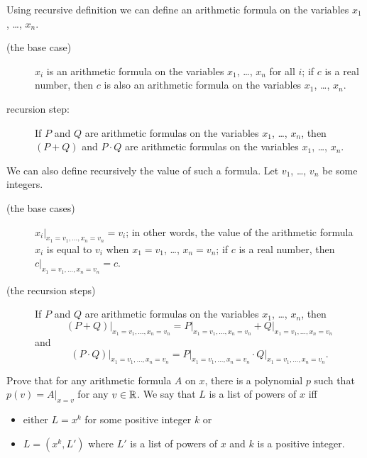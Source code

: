 \begin{chapterendexercises}
    \exercise[recommended]
        Using recursive definition we can define an arithmetic formula on the
        variables $x_1$, \dots, $x_n$.
        \begin{description}
            \item [(the base case)] $x_i$ is an arithmetic formula on the variables $x_1$,
                \dots, $x_n$ for all $i$; if $c$ is a real number, then $c$ is also
                an arithmetic formula on the variables $x_1$, \dots, $x_n$.
            \item[recursion step:] If $P$ and $Q$ are arithmetic formulas on the variables
                $x_1$, \dots, $x_n$, then $(P + Q)$ and $P \cdot Q$ are arithmetic formulas
                on the variables $x_1$, \dots, $x_n$.
        \end{description}

        We can also define recursively the value of such a formula.
        Let $v_1$, \dots, $v_n$ be some integers.
        \begin{description}
            \item[(the base cases)] $x_i\big\rvert_{x_1 = v_1, \dots, x_n = v_n} = v_i$; in
                other words, the value of the arithmetic formula $x_i$ is equal to $v_i$
                when $x_1 = v_1$, \dots, $x_n = v_n$; if $c$ is a real number, then
                $c\rvert_{x_1 = v_1, \dots, x_n = v_n} = c$.
            \item[(the recursion steps)] If $P$ and $Q$ are arithmetic formulas on the
            variables $x_1$, \dots, $x_n$, then
            \[
                (P + Q)\big\rvert_{x_1 = v_1, \dots, x_n = v_n} =
                P\big\rvert_{x_1 = v_1, \dots, x_n = v_n} +
                Q\big\rvert_{x_1 = v_1, \dots, x_n = v_n}
            \]
            and
            \[
                (P \cdot Q)\big\rvert_{x_1 = v_1, \dots, x_n = v_n} =
                P\big\rvert_{x_1 = v_1, \dots, x_n = v_n} \cdot
                Q\big\rvert_{x_1 = v_1, \dots, x_n = v_n}.
            \]
        \end{description}

        Prove that for any arithmetic formula $A$ on $x$, there is a polynomial
        $p$ such that $p(v) = A\big\rvert_{x = v}$ for any $v \in {\mathbb{R}}$.
    \exercise We say that $L$ is a list of powers of $x$ iff
        \begin{itemize}
            \item either $L = x^k$ for some positive integer $k$ or
            \item $L = (x^k, L')$ where $L'$ is a list of powers of $x$ and
                $k$ is a positive integer.
        \end{itemize}


\end{chapterendexercises}
